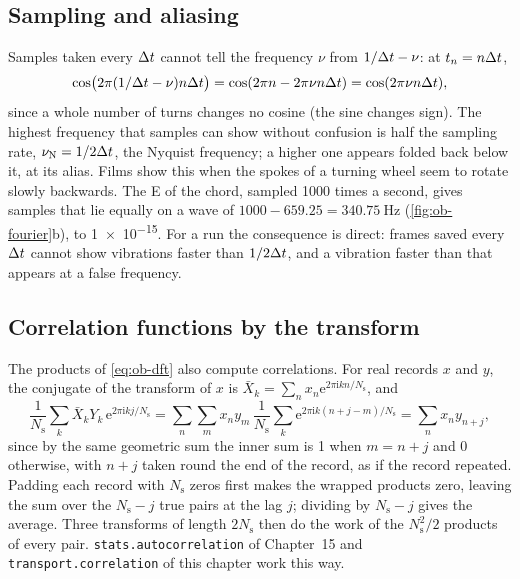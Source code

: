 \subsection*{Sampling and aliasing}

Samples taken every $\Delta t$ cannot tell the frequency $\nu$ from $1/\Delta t
- \nu$: at $t_n = n\Delta t$,
\begin{equation*}
   \cos\bigl(2\pi(1/\Delta t - \nu)n\Delta t\bigr) = \cos(2\pi n - 2\pi\nu n
   \Delta t) = \cos(2\pi\nu n\Delta t) ,
\end{equation*}
since a whole number of turns changes no cosine (the sine changes sign).
The highest frequency that samples can show without confusion is half the
sampling rate, $\nu_{\mathrm N} = 1/2\Delta t$, the Nyquist frequency; a
higher one appears folded back below it, at its alias. Films show this
when the spokes of a turning wheel seem to rotate slowly backwards. The E
of the chord, sampled 1000 times a second, gives samples that lie equally
on a wave of $1000 - 659.25 = \SI{340.75}{\hertz}$ (\cref{fig:ob-fourier}b),
to \num{1e-15}. For a run the consequence is direct: frames saved every
$\Delta t$ cannot show vibrations faster than $1/2\Delta t$, and a vibration
faster than that appears at a false frequency.

\subsection*{Correlation functions by the transform}

The products of \cref{eq:ob-dft} also compute correlations. For real
records $x$ and $y$, the conjugate of the transform of $x$ is $\bar X_k =
\sum_nx_n\mathrm{e}^{2\pi\mathrm{i}kn/N_{\mathrm s}}$, and
\begin{equation*}
   \frac{1}{N_{\mathrm s}}\sum_k\bar X_kY_k\,
   \mathrm{e}^{2\pi\mathrm{i}kj/N_{\mathrm s}}
   = \sum_n\sum_mx_ny_m\,\frac{1}{N_{\mathrm s}}\sum_k
   \mathrm{e}^{2\pi\mathrm{i}k(n + j - m)/N_{\mathrm s}}
   = \sum_nx_ny_{n+j} ,
\end{equation*}
since by the same geometric sum the inner sum is 1 when $m = n + j$ and 0
otherwise, with $n + j$ taken round the end of the record, as if the
record repeated. Padding each record with $N_{\mathrm s}$ zeros first makes
the wrapped products zero, leaving the sum over the $N_{\mathrm s} - j$
true pairs at the lag $j$; dividing by $N_{\mathrm s} - j$ gives the
average. Three transforms of length $2N_{\mathrm s}$ then do the work of
the $N_{\mathrm s}^2/2$ products of every pair. \texttt{stats.autocorrelation} of Chapter~15 and
\texttt{transport.correlation} of this chapter work this way.

